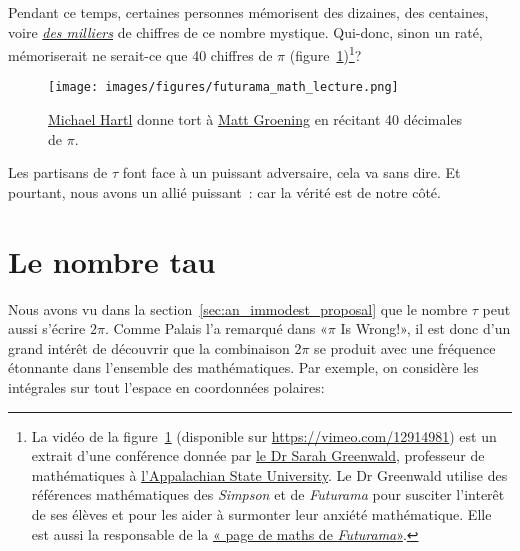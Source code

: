 Pendant ce temps, certaines personnes mémorisent des dizaines, des centaines,
voire
\href{https://translate.google.com/translate?sl=en&tl=fr&u=https://www.guinnessworldrecords.com/world-records/most-pi-places-memorised}{\emph{des
milliers}} de chiffres de ce nombre mystique. Qui-donc, sinon un raté, mémoriserait ne serait-ce
que 40 chiffres de $\pi$ (figure~\ref{fig:futurama_video})\ns\footnote{La vidéo de la
figure~\ref{fig:futurama_video} (disponible sur
\url{https://vimeo.com/12914981}) est un extrait d'une conférence donnée par
\href{https://translate.google.com/translate?sl=en&tl=fr&u=https://cs.appstate.edu/~sjg/}{le Dr Sarah
Greenwald}, professeur de
mathématiques à \href{https://www.appstate.edu/}{l'Appalachian State
University}. Le Dr Greenwald utilise des références mathématiques des
\emph{Simpson} et de \emph{Futurama} pour susciter l'interêt de ses élèves et
pour les aider à surmonter leur anxiété mathématique. Elle est aussi la
responsable de la
\href{https://translate.google.com/translate?sl=en&tl=fr&u=https://cs.appstate.edu/~sjg/futurama/}{«\ns
page de maths de \emph{Futurama}\ns »}.}\ns?

\begin{figure}
\begin{center}
\texttt{[image: images/figures/futurama\_math\_lecture.png]} %
\end{center}
\caption{\href{https://tauday.com/le-manifeste-de-tau/\#sec-about_the_author}{Michael
Hartl} donne tort à \href{https://fr.wikipedia.org/wiki/Matt_Groening}{Matt
Groening} en récitant 40 décimales de $\pi$.\label{fig:futurama_video}}
\end{figure}

Les partisans de $\tau$ font face à un puissant adversaire, cela va sans dire. Et
pourtant, nous avons un allié puissant~: car la vérité est de notre côté.


\section{Le nombre tau} %
\label{sec:the_number_tau}

Nous avons vu dans la section~\ref{sec:an_immodest_proposal} que le nombre $\tau$ peut aussi s'écrire
$2\pi$. Comme Palais l'a remarqué dans «\ns $\pi$ Is Wrong!\ns », il est donc d'un grand
intérêt de découvrir que la combinaison $2\pi$ se produit avec une fréquence
étonnante dans l'ensemble des mathématiques. Par exemple, on considère les
intégrales sur tout l'espace en coordonnées polaires:

